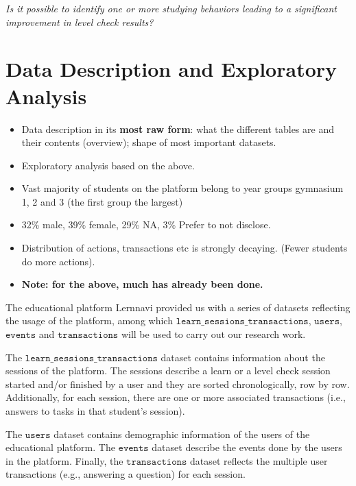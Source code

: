 \documentclass[sigplan,screen]{acmart}
\begin{document}
\begin{displayquote}
\textit{Is it possible to identify one or more studying behaviors leading to a significant improvement in level check results?}
\end{displayquote}



\section{Data Description and Exploratory Analysis}\label{sec:data}

{\color{red}
\begin{itemize}
    \item Data description in its \textbf{most raw form}: what the different tables are and their contents (overview); shape of most important datasets.
    \item Exploratory analysis based on the above.
    \item Vast majority of students on the platform belong to year groups gymnasium 1, 2 and 3 (the first group the largest)
    \item 32\% male, 39\% female, 29\% NA, 3\% Prefer to not disclose. 
    \item Distribution of actions, transactions etc is strongly decaying. (Fewer students do more actions).  
    \item \textbf{Note: for the above, much has already been done.} 
\end{itemize}
}

The educational platform Lernnavi provided us with a series of datasets reflecting the usage of the platform, among which $\texttt{learn\_sessions\_transactions}$, $\texttt{users}$, $\texttt{events}$ and $\texttt{transactions}$ will be used to carry out our research work.

The $\texttt{learn\_sessions\_transactions}$ dataset contains information about the sessions of the platform. The sessions describe a learn or a level check session started and/or finished by a user and they are sorted chronologically, row by row. Additionally, for each session, there are one or more associated transactions (i.e., answers to tasks in that student's session).

The $\texttt{users}$ dataset contains demographic information of the users of the educational platform. The $\texttt{events}$ dataset describe the events done by the users in the platform. Finally, the $\texttt{transactions}$ dataset reflects the multiple user transactions (e.g., answering a question) for each session.
\end{document}
